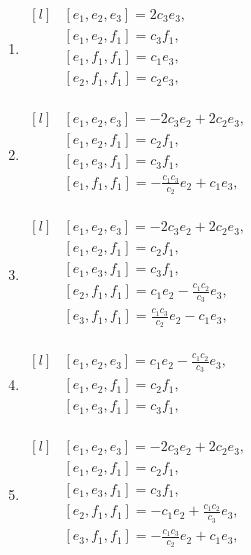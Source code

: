 \begin{adjustwidth*}{-0.5cm}{0cm}
\begin{multicols*}{2}
\begin{enumerate}
    \item $\begin{matrix*}[l]
            & [e_1, e_2, e_3] =  2 c_{3} e_3, \\
            & [e_1, e_2, f_1] = c_{3} f_1, \\
            & [e_1, f_1, f_1] =  c_{1} e_3, \\
            & [e_2, f_1, f_1] =  c_{2} e_3, \\
        \end{matrix*}$

    \item $\begin{matrix*}[l]
            & [e_1, e_2, e_3] =  - 2 c_{3} e_2 + 2 c_{2} e_3, \\
            & [e_1, e_2, f_1] = c_{2} f_1, \\
            & [e_1, e_3, f_1] = c_{3} f_1, \\
            & [e_1, f_1, f_1] =  - \frac{c_{1} c_{3}}{c_{2}} e_2 + c_{1} e_3, \\
        \end{matrix*}$

    \item $\begin{matrix*}[l]
            & [e_1, e_2, e_3] =  - 2 c_{3} e_2 + 2 c_{2} e_3, \\
            & [e_1, e_2, f_1] = c_{2} f_1, \\
            & [e_1, e_3, f_1] = c_{3} f_1, \\
            & [e_2, f_1, f_1] =  c_{1} e_2 - \frac{c_{1} c_{2}}{c_{3}} e_3, \\
            & [e_3, f_1, f_1] =  \frac{c_{1} c_{3}}{c_{2}} e_2 - c_{1} e_3, \\
        \end{matrix*}$

    \item $\begin{matrix*}[l]
            & [e_1, e_2, e_3] =  c_{1} e_2 - \frac{c_{1} c_{2}}{c_{3}} e_3, \\
            & [e_1, e_2, f_1] = c_{2} f_1, \\
            & [e_1, e_3, f_1] = c_{3} f_1, \\
        \end{matrix*}$

    \item $\begin{matrix*}[l]
            & [e_1, e_2, e_3] =  - 2 c_{3} e_2 + 2 c_{2} e_3, \\
            & [e_1, e_2, f_1] = c_{2} f_1, \\
            & [e_1, e_3, f_1] = c_{3} f_1, \\
            & [e_2, f_1, f_1] =  - c_{1} e_2 + \frac{c_{1} c_{2}}{c_{3}} e_3, \\
            & [e_3, f_1, f_1] =  - \frac{c_{1} c_{3}}{c_{2}} e_2 + c_{1} e_3, \\
        \end{matrix*}$


\end{enumerate}
\end{multicols*}
\end{adjustwidth*}
